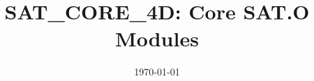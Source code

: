 \documentclass[12pt]{article}
\title{SAT\_CORE\_4D: Core SAT.O Modules}
\date{\today}
\begin{document}
\maketitle

\label{mod:O1}

\label{mod:O2}

\label{mod:O3}

\label{mod:O4}

\label{mod:O5}

\label{mod:O6}

\label{mod:O7}

\label{mod:O8}
\end{document}
